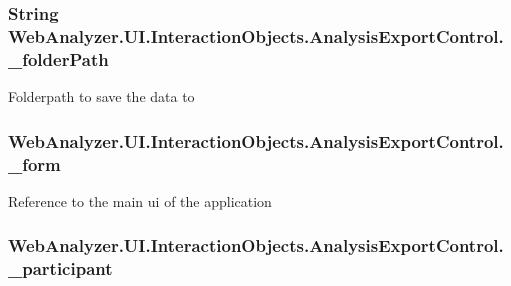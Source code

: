 \subsubsection[{\+\_\+folder\+Path}]{\setlength{\rightskip}{0pt plus 5cm}String Web\+Analyzer.\+U\+I.\+Interaction\+Objects.\+Analysis\+Export\+Control.\+\_\+folder\+Path\hspace{0.3cm}{\ttfamily [private]}}\label{class_web_analyzer_1_1_u_i_1_1_interaction_objects_1_1_analysis_export_control_a52ae3dbae930a01e4ddb368fdd820ac7}


Folderpath to save the data to 

\hypertarget{class_web_analyzer_1_1_u_i_1_1_interaction_objects_1_1_analysis_export_control_ac37986028e8f14ebe20b3e70cc2bafe5}{}
\subsubsection[{\+\_\+form}]{ Web\+Analyzer.\+U\+I.\+Interaction\+Objects.\+Analysis\+Export\+Control.\+\_\+form\hspace{0.3cm}{\ttfamily [private]}}\label{class_web_analyzer_1_1_u_i_1_1_interaction_objects_1_1_analysis_export_control_ac37986028e8f14ebe20b3e70cc2bafe5}


Reference to the main ui of the application 

\hypertarget{class_web_analyzer_1_1_u_i_1_1_interaction_objects_1_1_analysis_export_control_ace272af8988b6cfc198db79bb6c2cd13}{}
\subsubsection[{\+\_\+participant}]{ Web\+Analyzer.\+U\+I.\+Interaction\+Objects.\+Analysis\+Export\+Control.\+\_\+participant\hspace{0.3cm}{\ttfamily [private]}}\label{class_web_analyzer_1_1_u_i_1_1_interaction_objects_1_1_analysis_export_control_ace272af8988b6cfc198db79bb6c2cd13}


